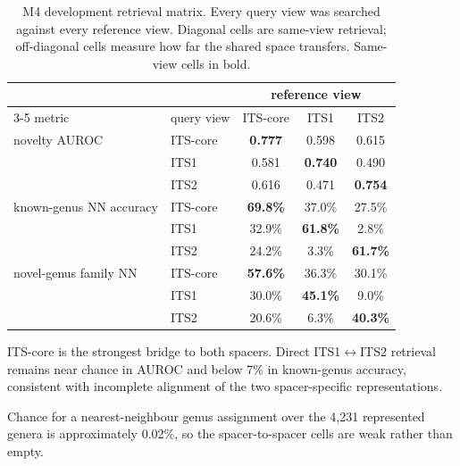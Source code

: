 \begin{table}[htbp]\centering
\begin{threeparttable}
\caption{M4 development retrieval matrix. Every query view was searched against every reference view. Diagonal cells are same-view retrieval; off-diagonal cells measure how far the shared space transfers. Same-view cells in bold.}
\label{tab:m4matrix}
\begin{tabular}{llccc}
\toprule
 & & \multicolumn{3}{c}{reference view} \\
\cmidrule(l){3-5}
metric & query view & ITS-core & ITS1 & ITS2 \\
\midrule
novelty AUROC & ITS-core & \textbf{0.777} & 0.598 & 0.615 \\
 & ITS1 & 0.581 & \textbf{0.740} & 0.490 \\
 & ITS2 & 0.616 & 0.471 & \textbf{0.754} \\
\addlinespace
known-genus NN accuracy & ITS-core & \textbf{69.8\%} & 37.0\% & 27.5\% \\
 & ITS1 & 32.9\% & \textbf{61.8\%} & 2.8\% \\
 & ITS2 & 24.2\% & 3.3\% & \textbf{61.7\%} \\
\addlinespace
novel-genus family NN & ITS-core & \textbf{57.6\%} & 36.3\% & 30.1\% \\
 & ITS1 & 30.0\% & \textbf{45.1\%} & 9.0\% \\
 & ITS2 & 20.6\% & 6.3\% & \textbf{40.3\%} \\
\bottomrule
\end{tabular}
\begin{tablenotes}\footnotesize
\item ITS-core is the strongest bridge to both spacers. Direct ITS1$\leftrightarrow$ITS2 retrieval remains near chance in AUROC and below 7\% in known-genus accuracy, consistent with incomplete alignment of the two spacer-specific representations.
\item Chance for a nearest-neighbour genus assignment over the 4,231 represented genera is approximately 0.02\%, so the spacer-to-spacer cells are weak rather than empty.
\end{tablenotes}
\end{threeparttable}
\end{table}
